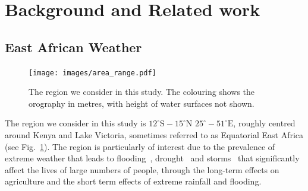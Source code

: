 \documentclass{article}
\begin{document}
\section{Background and Related work}

\subsection{East African Weather}


\begin{figure}[t]
    \centering
    \texttt{[image: images/area\_range.pdf]}
    
    \caption{The region we consider in this study. The colouring shows the orography in metres, with height of water surfaces not shown.}
    \label{fig:cgan_sample}
\end{figure}

The region we consider in this study is $12^{\circ}\text{S}-15^{\circ}\text{N}$   $25^{\circ}-51^{\circ}\text{E}$, roughly centred around Kenya and Lake Victoria, sometimes referred to as Equatorial East Africa (see Fig.~\ref{fig:cgan_sample}). The region is particularly of interest due to the prevalence of extreme weather that leads to flooding~\citep{kilavi_extreme_2018,wainwright_extreme_2021}, drought~\citep{gebremeskel_haile_droughts_2019} and storms~\citep{thiery_hazardous_2016, woodhams_identifying_2019} that significantly affect the lives of large numbers of people, through the long-term effects on agriculture and the short term effects of extreme rainfall and flooding. 


 
\end{document}
